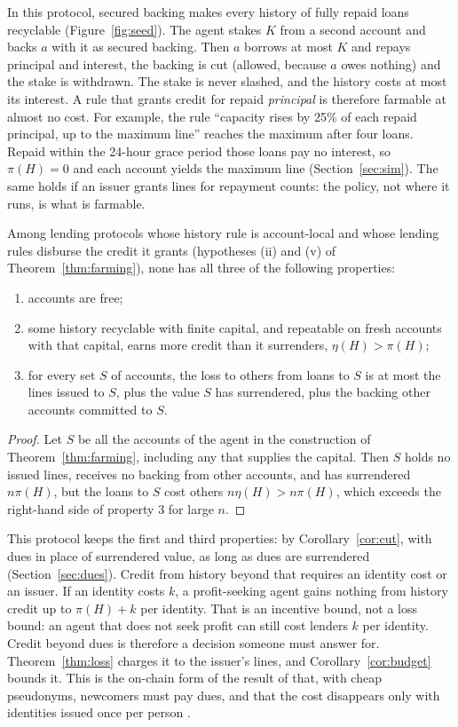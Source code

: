 \documentclass[acmsmall,nonacm,screen]{acmart}
\theoremstyle{acmdefinition}%
\begin{document}
In this protocol, secured backing makes every history of fully repaid loans recyclable
(Figure~\ref{fig:seed}). The agent stakes $K$ from a second account and backs $a$ with it as secured
backing. Then $a$ borrows at most $K$ and repays principal and interest, the backing is cut (allowed,
because $a$ owes nothing) and the stake is withdrawn. The stake is never slashed, and the history
costs at most its interest. A rule that grants credit for repaid \emph{principal} is therefore
farmable at almost no cost. For example, the rule ``capacity rises by 25\% of each repaid principal,
up to the maximum line'' reaches the maximum after four loans. Repaid within the 24-hour grace period
those loans pay no interest, so $\pi(H)=0$ and each account yields the maximum line
(Section~\ref{sec:sim}). The same holds if an issuer grants lines for repayment counts: the policy,
not where it runs, is what is farmable.

\begin{corollary}[Trilemma]\label{cor:trilemma}
Among lending protocols whose history rule is account-local and whose lending rules disburse the
credit it grants (hypotheses (ii) and (v) of Theorem~\ref{thm:farming}), none has all three of the
following properties:
\begin{enumerate}
\item accounts are free;
\item some history recyclable with finite capital, and repeatable on fresh accounts with that
  capital, earns more credit than it surrenders, $\eta(H)>\pi(H)$;
\item for every set $S$ of accounts, the loss to others from loans to $S$ is at most the lines
  issued to $S$, plus the value $S$ has surrendered, plus the backing other accounts committed to $S$.
\end{enumerate}
\end{corollary}

\begin{proof}
Let $S$ be all the accounts of the agent in the construction of Theorem~\ref{thm:farming},
including any that supplies the capital. Then $S$ holds no issued lines, receives no backing from
other accounts, and has surrendered $n\pi(H)$, but the loans to $S$ cost others $n\eta(H)>n\pi(H)$,
which exceeds the right-hand side of property 3 for large $n$.
\end{proof}

This protocol keeps the first and third properties: by Corollary~\ref{cor:cut}, with dues in place
of surrendered value, as long as dues are surrendered (Section~\ref{sec:dues}). Credit from history
beyond that requires an identity cost or an issuer. If an identity costs $k$, a profit-seeking agent
gains nothing from history credit up to $\pi(H)+k$ per identity. That is an incentive bound, not a
loss bound: an agent that does not seek profit can still cost lenders $k$ per identity. Credit beyond
dues is therefore a decision someone must answer for. Theorem~\ref{thm:loss} charges it to the
issuer's lines, and Corollary~\ref{cor:budget} bounds it. This is the on-chain form of the result of
\citet{friedman2001cheap} that, with cheap pseudonyms, newcomers must pay dues, and that the cost
disappears only with identities issued once per person \citep{borge2017personhood}.
\end{document}
